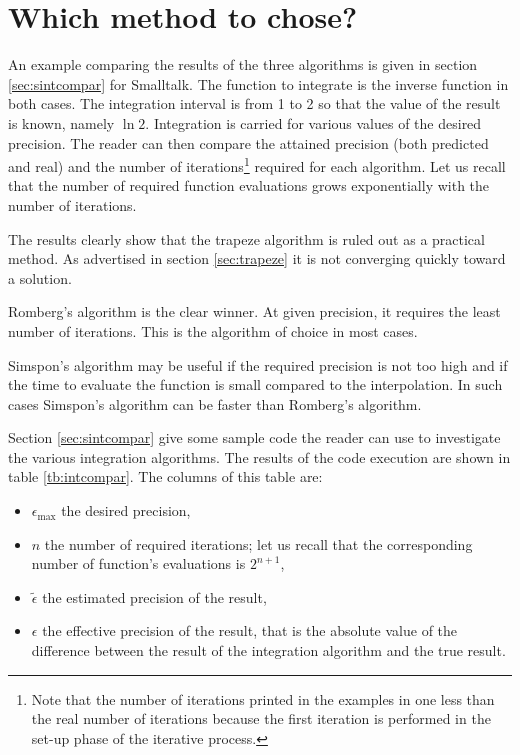 \section{Which method to chose?}
\label{sec:intwhich} An example comparing the results of the three
algorithms is given in section \ref{sec:sintcompar} for Smalltalk.
The function to integrate is the inverse function in both cases. The integration
interval is from 1 to 2 so that the value of the result is known,
namely $\ln 2$. Integration is carried for various values of the
desired precision. The reader can then compare the attained
precision (both predicted and real) and the number of
iterations\footnote{Note that the number of iterations printed in
the examples in one less than the real number of iterations
because the first iteration is performed in the set-up phase of
the iterative process.} required for each algorithm. Let us recall
that the number of required function evaluations grows
exponentially with the number of iterations.

The results clearly show that the trapeze algorithm is ruled out
as a practical method. As advertised in section \ref{sec:trapeze}
it is not converging quickly toward a solution.

Romberg's algorithm is the clear winner. At given precision, it
requires the least number of iterations. This is the algorithm of
choice in most cases.

Simspon's algorithm may be useful if the required precision is not
too high and if the time to evaluate the function is small
compared to the interpolation. In such cases Simspon's algorithm
can be faster than Romberg's algorithm.

Section \ref{sec:sintcompar} give some sample code the reader can use to
investigate the various integration algorithms.
The results of the code execution are shown in table \ref{tb:intcompar}.
The columns of this table are:
\begin{itemize}
\item $\epsilon_{\mathop{\textrm{max}}}$ the desired precision,\\
\item $n$ the number of required iterations; let us recall that the
corresponding number of function's evaluations is $2^{n+1}$,\\
\item $\tilde{\epsilon}$ the estimated precision of the result,\\
\item $\epsilon$ the effective precision of the result, that is the absolute value
of the difference between the result of the integration algorithm and the true result.\\
\end{itemize}

